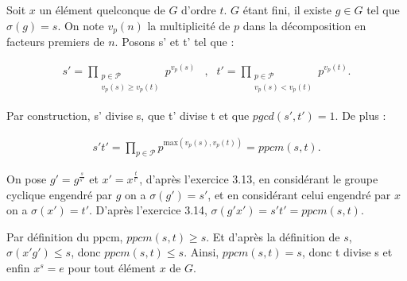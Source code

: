 
Soit $x$ un élément quelconque de $G$ d'ordre $t$. $G$ étant fini, il existe $g\in G$ tel que $ \sigma (g)=s$. On note $v_p(n)$ la multiplicité de $p$ dans la décomposition en facteurs premiers de $n$. Posons s' et t' tel que :


\begin{align*}
    s' = \prod_{\substack{p \in \mathcal{P}\\ v_p(s) \geq v_p(t)}} p^{v_p(s)} & ,&t'=\prod_{\substack{p \in \mathcal{P}\\ v_p(s) < v_p(t)}} p^{v_p(t)}.
\end{align*}

Par construction, s' divise s, que t' divise t et que $pgcd(s',t')=1$. De plus :

\begin{align*}
    s't' = \prod_{p \in \mathcal{P}} p^{\text{max}(v_p(s),v_p(t))} = ppcm(s,t).
\end{align*}

On pose $g' = g^{\frac{s}{s'}}$ et $x' = x^{\frac{t}{t'}}$, d'après l'exercice 3.13, en considérant le groupe cyclique engendré par $g$ on a $\sigma(g') = s'$, et en considérant celui engendré par $x$ on a $\sigma(x')=t'$. D'après l'exercice 3.14, $\sigma(g'x') = s't' = ppcm(s,t)$.

Par définition du ppcm, $ppcm(s,t) \geq s$. Et d'après la définition de $s$, $\sigma(x'g') \leq s$, donc $ppcm(s,t) \leq s$. Ainsi, $ppcm(s,t) = s$, donc t divise s et enfin $x^s=e$ pour tout élément $x$ de $G$. 